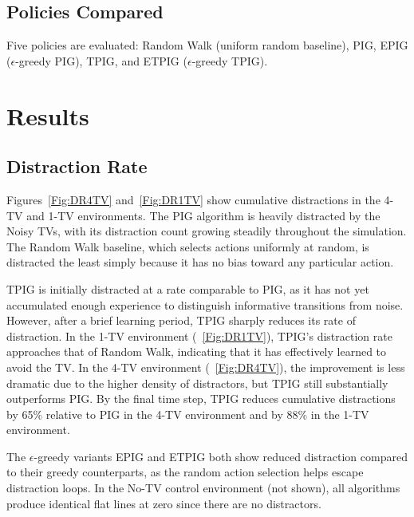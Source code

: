 \documentclass[letterpaper]{article}
\begin{document}
\subsection{Policies Compared}

Five policies are evaluated: Random Walk (uniform random baseline),
PIG, EPIG ($\epsilon$-greedy PIG), TPIG, and ETPIG ($\epsilon$-greedy
TPIG).

\section{Results}

\subsection{Distraction Rate}

Figures~\ref{Fig:DR4TV} and~\ref{Fig:DR1TV} show
cumulative distractions in the 4-TV and 1-TV environments.  The PIG algorithm is
heavily distracted by the Noisy TVs, with its distraction count
growing steadily throughout the simulation.  The Random Walk baseline,
which selects actions uniformly at random, is distracted the least
simply because it has no bias toward any particular action.

TPIG is initially distracted at a rate comparable to PIG, as it has
not yet accumulated enough experience to distinguish informative
transitions from noise.  However, after a brief learning period, TPIG
sharply reduces its rate of distraction.  In the 1-TV environment
(\figurename~\ref{Fig:DR1TV}), TPIG's distraction rate approaches that
of Random Walk, indicating that it has effectively learned to avoid
the TV.  In the 4-TV environment (\figurename~\ref{Fig:DR4TV}), the
improvement is less dramatic due to the higher density of distractors,
but TPIG still substantially outperforms PIG.
By the final time step, TPIG reduces cumulative distractions by 65\% relative to PIG in the 4-TV environment and by 88\% in the 1-TV environment.

The $\epsilon$-greedy variants EPIG and ETPIG both show reduced
distraction compared to their greedy counterparts, as the random
action selection helps escape distraction loops.  In the No-TV control
environment (not shown), all algorithms produce identical flat lines
at zero since there are no distractors.
\end{document}
